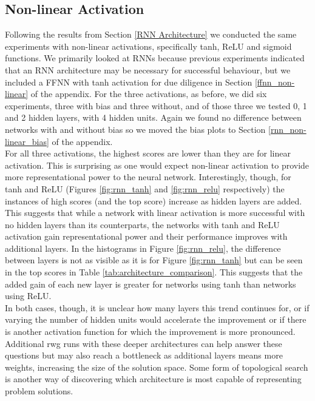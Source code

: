 \documentclass[12pt]{article}
\begin{document}
	
					
\subsection{Non-linear Activation}\label{non-linear}

Following the results from Section \ref{RNN Architecture} we conducted the same experiments with non-linear activations, specifically tanh, ReLU and sigmoid functions. 
We primarily looked at RNNs because previous experiments indicated that an RNN architecture may be necessary for successful behaviour, but we included a FFNN with tanh activation for due diligence in Section \ref{ffnn_non-linear} of the appendix. 
For the three activations, as before, we did six experiments, three with bias and three without, and of those three we tested 0, 1 and 2 hidden layers, with 4 hidden units.
Again we found no difference between networks with and without bias so we moved the bias plots to Section \ref{rnn_non-linear_bias} of the appendix.\\

For all three activations, the highest scores are lower than they are for linear activation. 
This is surprising as one would expect non-linear activation to provide more representational power to the neural network. 
Interestingly, though, for tanh and ReLU (Figures \ref{fig:rnn_tanh} and \ref{fig:rnn_relu} respectively) the instances of high scores (and the top score) increase as hidden layers are added. 
This suggests that while a network with linear activation is more successful with no hidden layers than its counterparts, the networks with tanh and ReLU activation gain representational power and their performance improves with additional layers. 
In the histograms in Figure \ref{fig:rnn_relu}, the difference between layers is not as visible as it is for Figure \ref{fig:rnn_tanh} but can be seen in the top scores in Table \ref{tab:architecture_comparison}. 
This suggests that the added gain of each new layer is greater for networks using tanh than networks using ReLU.\\

In both cases, though, it is unclear how many layers this trend continues for, or if varying the number of hidden units would accelerate the improvement or if there is another activation function for which the improvement is more pronounced. 
Additional rwg runs with these deeper architectures can help answer these questions but may also reach a bottleneck as additional layers means more weights, increasing the size of the solution space. 
Some form of topological search \cite{stanley:MIT:2002} is another way of discovering which architecture is most capable of representing problem solutions.\\ 
\end{document}
